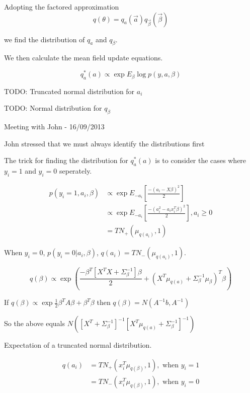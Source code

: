 \documentclass{amsart}
\begin{document}
Adopting the factored approximation
\[
q(\theta) = q_a(\vec{a}) q_{\vec{\beta}}(\vec{\beta})
\]

we find the distribution of $q_a$ and $q_\beta$.


We then calculate the mean field update equations.

\[
q_a^*(a) \propto \exp{E_\beta \log{p(y, a, \beta)}}
\]

TODO: Truncated normal distribution for $a_i$

TODO: Normal distribution for $q_\beta$

Meeting with John - 16/09/2013

John stressed that we must always identify the distributions first

The trick for finding the distribution for $q_a^*(a)$ is to consider the cases where
$y_i=1$ and $y_i=0$ seperately.

\begin{align*}
p(y_i=1, a_i, \beta) &\propto \exp{E_{-a_i} \left[\frac{-(a_i - X \beta)^2}{2}\right]} \\
&\propto \exp{E_{-a_i}\left[\frac{-(a_i^2 - a_i x_i^T \beta)^2}{2}\right]}, a_i \geq 0 \\
&= TN_+(\mu_{q(a_i)}, 1)
\end{align*}

When $y_i=0$, $p(y_i=0|a_i, \beta)$, $q(a_i) = TN_{-} (\mu_{q(a_i)}, 1)$.

\[
q(\beta) \propto \exp{\left( \frac{-\beta^T[X^T X + \Sigma_{\beta}^{-1}]\beta}{2} + (X^T \mu_{q(a)} + \Sigma_{\beta}^{-1} \mu_{\beta} )^T \beta \right)}
\]

If $q(\beta) \propto \exp{\frac{1}{2}\beta^T A \beta + \beta^T \beta}$ then $q(\beta) = N(A^{-1}b, A^{-1})$

So the above equals $N([X^T + \Sigma_{\beta}^{-1}]^{-1} [X^T \mu_{q(a)} + \Sigma_{\beta}^{-1}]^{-1})$

Expectation of a truncated normal distribution.

\begin{align*}
q(a_i) &= TN_{+}(x_i^T \mu_{q(\beta)}, 1), \text{ when } y_i=1 \\
&=TN_{-}(x_i^T \mu_{q(\beta)}, 1), \text{ when } y_i=0 
\end{align*}
\end{document}
